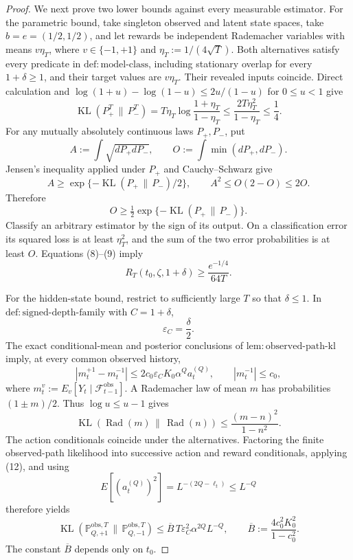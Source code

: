 \documentclass{article}
\begin{document}
\begin{proof}
We next prove two lower bounds against every measurable estimator.  For the parametric bound, take singleton observed and latent state spaces, take \(b=e=(1/2,1/2)\), and let rewards be independent Rademacher variables with means \(v\eta_T\), where \(v\in\{-1,+1\}\) and \(\eta_T:=1/(4\sqrt T)\).  Both alternatives satisfy every predicate in \(\mathrm{def{:}model\text{-}class}\), including stationary overlap for every \(1+\delta\ge1\), and their target values are \(v\eta_T\).  Their revealed inputs coincide.  Direct calculation and \(\log(1+u)-\log(1-u)\le2u/(1-u)\) for \(0\le u<1\) give
\[
 \operatorname{KL}(P_+^T\,\|\,P_-^T)
 =T\eta_T\log\frac{1+\eta_T}{1-\eta_T}
 \le\frac{2T\eta_T^2}{1-\eta_T}\le\frac14. \tag{8}
\]
For any mutually absolutely continuous laws \(P_+,P_-\), put
\[
 A:=\int\sqrt{dP_+dP_-},
 \qquad O:=\int\min(dP_+,dP_-).
\]
Jensen's inequality applied under \(P_+\) and Cauchy--Schwarz give
\[
 A\ge \exp\{-\operatorname{KL}(P_+\,\|\,P_-)/2\},
 \qquad
 A^2\le O(2-O)\le2O.
\]
Therefore
\[
 O\ge\tfrac12\exp\{-\operatorname{KL}(P_+\,\|\,P_-)\}. \tag{9}
\]
Classify an arbitrary estimator by the sign of its output.  On a classification error its squared loss is at least \(\eta_T^2\), and the sum of the two error probabilities is at least \(O\).  Equations (8)--(9) imply
\[
 R_T(t_0,\zeta,1+\delta)
 \ge \frac{e^{-1/4}}{64T}. \tag{10}
\]

For the hidden-state bound, restrict to sufficiently large \(T\) so that \(\delta\le1\).  In \(\mathrm{def{:}signed\text{-}depth\text{-}family}\) with \(C=1+\delta\),
\[
 \varepsilon_C=\frac\delta2. \tag{11}
\]
The exact conditional-mean and posterior conclusions of \(\mathrm{lem{:}observed\text{-}path\text{-}kl}\) imply, at every common observed history,
\[
 |m_t^{+1}-m_t^{-1}|
 \le2c_0\varepsilon_CK_0\alpha^Qa_t^{(Q)},
 \qquad |m_t^{-1}|\le c_0,
\]
where \(m_t^v:=E_v[Y_t\mid\mathcal F_{t-1}^{\mathrm{obs}}]\).  A Rademacher law of mean \(m\) has probabilities \((1\pm m)/2\).  Thus \(\log u\le u-1\) gives
\[
 \operatorname{KL}(\operatorname{Rad}(m)\,\|\,\operatorname{Rad}(n))
 \le\frac{(m-n)^2}{1-n^2}. \tag{12}
\]
The action conditionals coincide under the alternatives.  Factoring the finite observed-path likelihood into successive action and reward conditionals, applying (12), and using
\[
 E[(a_t^{(Q)})^2]
 =L^{-(2Q-\ell_t)}\le L^{-Q}
\]
therefore yields
\[
 \operatorname{KL}(\mathbb P_{Q,+1}^{\mathrm{obs},T}\,\|\,
                    \mathbb P_{Q,-1}^{\mathrm{obs},T})
 \le \overline B\,T\varepsilon_C^2\alpha^{2Q}L^{-Q},
 \qquad
 \overline B:=\frac{4c_0^2K_0^2}{1-c_0^2}. \tag{13}
\]
The constant \(\overline B\) depends only on \(t_0\).


\end{proof}
\end{document}

